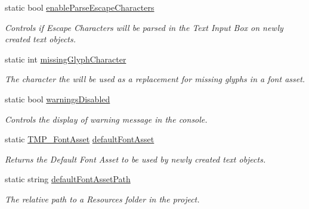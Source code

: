 \begin{DoxyCompactItemize}
static bool \mbox{\hyperlink{class_t_m_pro_1_1_t_m_p___settings_a955091add8374e2e7c9764fd56f6ae24}{enable\+Parse\+Escape\+Characters}}
\begin{DoxyCompactList}\small\item\em Controls if Escape Characters will be parsed in the Text Input Box on newly created text objects. \end{DoxyCompactList}\item 
static int \mbox{\hyperlink{class_t_m_pro_1_1_t_m_p___settings_ad2690f7fd21007a9146f94d898154761}{missing\+Glyph\+Character}}
\begin{DoxyCompactList}\small\item\em The character the will be used as a replacement for missing glyphs in a font asset. \end{DoxyCompactList}\item 
static bool \mbox{\hyperlink{class_t_m_pro_1_1_t_m_p___settings_a457e0b045af04f8bb1bfad4614dcab49}{warnings\+Disabled}}
\begin{DoxyCompactList}\small\item\em Controls the display of warning message in the console. \end{DoxyCompactList}\item 
static \mbox{\hyperlink{class_t_m_pro_1_1_t_m_p___font_asset}{T\+M\+P\+\_\+\+Font\+Asset}} \mbox{\hyperlink{class_t_m_pro_1_1_t_m_p___settings_a662e85495fdb4320e6d01287cc673220}{default\+Font\+Asset}}
\begin{DoxyCompactList}\small\item\em Returns the Default Font Asset to be used by newly created text objects. \end{DoxyCompactList}\item 
static string \mbox{\hyperlink{class_t_m_pro_1_1_t_m_p___settings_a92cb63534942cf953106de2c72f8358f}{default\+Font\+Asset\+Path}}
\begin{DoxyCompactList}\small\item\em The relative path to a Resources folder in the project. \end{DoxyCompactList}\item 

\end{DoxyCompactItemize}
